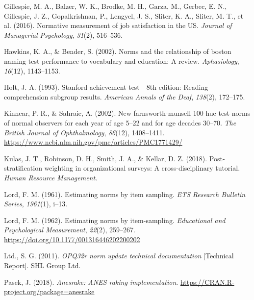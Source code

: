 \documentclass[
  ,man]{apa7}
\newlength{\cslhangindent}
\newlength{\cslentryspacingunit} %
\newenvironment{CSLReferences}[2] %
 {%
  \setlength{\parindent}{0pt}
  \ifodd #1
  \let\oldpar\par
  \def\par{\hangindent=\cslhangindent\oldpar}
  \fi
  \setlength{\parskip}{#2\cslentryspacingunit}
 }%
 {}
\begin{document}
\hypertarget{refs}{}
\begin{CSLReferences}{1}{0}
\leavevmode{}%
Gillespie, M. A., Balzer, W. K., Brodke, M. H., Garza, M., Gerbec, E. N., Gillespie, J. Z., Gopalkrishnan, P., Lengyel, J. S., Sliter, K. A., Sliter, M. T., et al. (2016). Normative measurement of job satisfaction in the US. \emph{Journal of Managerial Psychology}, \emph{31}(2), 516--536.

\leavevmode{}%
Hawkins, K. A., \& Bender, S. (2002). Norms and the relationship of boston naming test performance to vocabulary and education: A review. \emph{Aphasiology}, \emph{16}(12), 1143--1153.

\leavevmode{}%
Holt, J. A. (1993). Stanford achievement test---8th edition: Reading comprehension subgroup results. \emph{American Annals of the Deaf}, \emph{138}(2), 172--175.

\leavevmode{}%
Kinnear, P. R., \& Sahraie, A. (2002). New farnsworth-munsell 100 hue test norms of normal observers for each year of age 5--22 and for age decades 30--70. \emph{The British Journal of Ophthalmology}, \emph{86}(12), 1408--1411. \url{https://www.ncbi.nlm.nih.gov/pmc/articles/PMC1771429/}

\leavevmode{}%
Kulas, J. T., Robinson, D. H., Smith, J. A., \& Kellar, D. Z. (2018). Post-stratification weighting in organizational surveys: A cross-disciplinary tutorial. \emph{Human Resource Management}.

\leavevmode{}%
Lord, F. M. (1961). Estimating norms by item sampling. \emph{ETS Research Bulletin Series}, \emph{1961}(1), i--13.

\leavevmode{}%
Lord, F. M. (1962). Estimating norms by item-sampling. \emph{Educational and Psychological Measurement}, \emph{22}(2), 259--267. \url{https://doi.org/10.1177/001316446202200202}

\leavevmode{}%
Ltd., S. G. (2011). \emph{OPQ32r norm update technical documentation} {[}Technical Report{]}. SHL Group Ltd.

\leavevmode{}%
Pasek, J. (2018). \emph{Anesrake: ANES raking implementation}. \url{https://CRAN.R-project.org/package=anesrake}


\end{CSLReferences}
\end{document}
